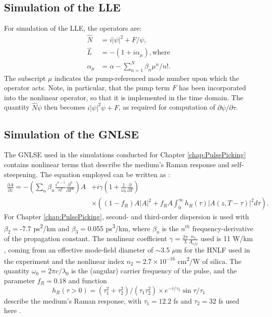\subsection{Simulation of the LLE}
For simulation of the LLE, the operators are: 
\begin{align}
\hat{N}&=i|\psi|^2+F/\psi,\\
\hat{L}&=-(1+i\alpha_\mu), \text{where}\\
\alpha_\mu&=\alpha-\sum_{n=1}^N\beta_n\mu^n/n!.
\end{align}
The subscript $\mu$ indicates the pump-referenced mode number upon which the operator acts. Note, in particular, that the pump term $F$ has been incorporated into the nonlinear operator, so that it is implemented in the time domain. The quantity $\hat{N}\psi$ then becomes $i|\psi|^2\psi+F$, as required for computation of $\partial\psi/\partial\tau$.

\subsection{Simulation of the GNLSE}

The GNLSE used in the simulations conducted for Chapter \ref{chap:PulsePicking} contains nonlinear terms that describe the medium's Raman response and self-steepening. The equation employed can be written as \cite{Hult2007,Agrawal2007}:
\begin{align}
\frac{\partial A}{\partial z}=-\left(\sum_n \beta_n \frac{i^{n-1}}{n!} \frac{\partial^n}{\partial T^n}\right)A&+i\gamma\left(1+\frac{1}{\omega_0}\frac{\partial}{\partial T}\right) \nonumber \\
&\times\left((1-f_R)A|A|^2+f_R A\int_0^\infty h_R(\tau)|A(z,T-\tau)|^2 d\tau\right).
\end{align}
For Chapter \ref{chap:PulsePicking}, second- and third-order dispersion is used with $\beta_2=$-7.7 ps\textsuperscript{2}/km and $\beta_3=$0.055 ps\textsuperscript{3}/km, where $\beta_n$ is the $n^{th}$ frequency-derivative of the propagation constant. The nonlinear coefficient $\gamma=\frac{2\pi}{\lambda}\frac{n_2}{A_{eff}}$ used is 11 W/km \cite{Hirano2009}, coming from an effective mode-field diameter of $\sim$3.5 $\mu$m for the HNLF used in the experiment and the nonlinear index $n_2=2.7\times10^{-16}$ cm\textsuperscript{2}/W of silica. The quantity $\omega_0=2\pi c/\lambda_0$ is the (angular) carrier frequency of the pulse, and the parameter $f_R=0.18$ and function
\begin{equation}
h_R(\tau>0)=(\tau_1^2+\tau_2^2)/(\tau_1 \tau_2^2)\times e^{-\tau/\tau_2}\sin{\tau/\tau_1}
\end{equation} 
describe the medium's Raman response, with $\tau_1=12.2$ fs and $\tau_2=32$ fs used here \cite{Agrawal2007,Hult2007,Blow1989}.

